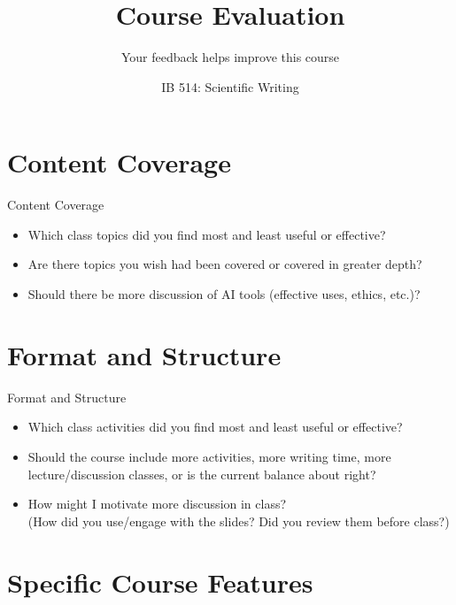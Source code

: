 \documentclass{beamer}
\title{Course Evaluation}
\subtitle{Your feedback helps improve this course}
\author[]{IB 514: Scientific Writing}
\date[]{}
\begin{document}
\begin{frame}
  \titlepage
\end{frame}


\section{Content Coverage}

\begin{frame}{Content Coverage}
  \begin{itemize}
    \item Which class topics did you find most and least useful or effective?
    \bigskip
    \item Are there topics you wish had been covered or covered in greater depth?
    \bigskip
    \item Should there be more discussion of AI tools (effective uses, ethics, etc.)?
  \end{itemize}
\end{frame}


\section{Format and Structure}

\begin{frame}{Format and Structure}
  \begin{itemize}
    \item Which class activities did you find most and least useful or effective?
    \bigskip
    \item Should the course include more activities, more writing time, more lecture/discussion classes, or is the current balance about right?
    \bigskip
    \item How might I motivate more discussion in class?\\
      \smallskip
      {\small (How did you use/engage with the slides? Did you review them before class?)}
  \end{itemize}
\end{frame}


\section{Specific Course Features}
\end{document}
